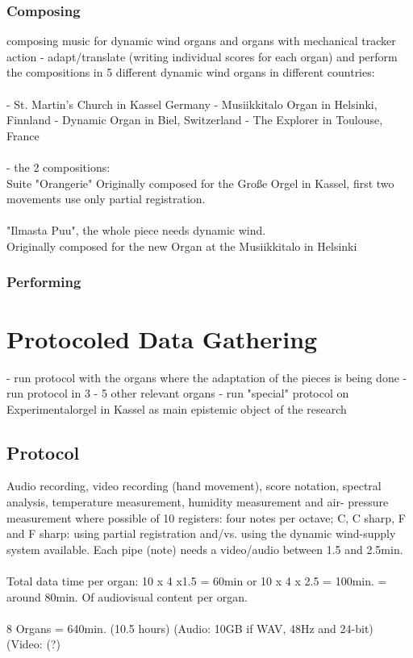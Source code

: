 \subsubsection{Composing} 
composing music for dynamic wind organs and organs with mechanical tracker action 
- adapt/translate (writing individual scores for each organ) and perform the compositions in 5 different dynamic wind organs in different countries: \\
\\
- St. Martin's Church in Kassel Germany
- Musiikkitalo Organ in Helsinki, Finnland
- Dynamic Organ in Biel, Switzerland
- The Explorer in Toulouse, France\\
\\
- the 2 compositions: 
\\
Suite "Orangerie" 
Originally composed for the Große Orgel in Kassel, first two movements use only partial registration.\\
\\
"Ilmasta Puu", the whole piece needs dynamic wind.\\
Originally composed for the new Organ at the Musiikkitalo in Helsinki\\

\subsubsection{Performing} 

\section{Protocoled Data Gathering}

- run protocol with the organs where the adaptation of the pieces is being done
- run protocol in 3 - 5 other relevant organs
- run "special" protocol on Experimentalorgel in Kassel as main epistemic object of the research 

\subsection{Protocol} 

Audio recording, video recording (hand movement), score notation, spectral analysis, temperature measurement, humidity measurement and air- pressure measurement where possible  of 10 registers: four notes per octave; C, C sharp, F and F sharp: using partial registration and/vs. using the dynamic wind-supply system available.
Each pipe (note) needs a video/audio between 1.5 and 2.5min. \\
\\
Total data time per organ: 10 x 4 x1.5 = 60min or 10 x 4 x 2.5 = 100min. = around 80min. Of audiovisual content per organ. \\
\\
8 Organs = 640min. (10.5 hours) (Audio: 10GB if WAV, 48Hz and 24-bit) (Video: (?)\\
\\
